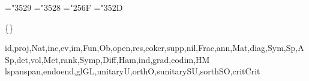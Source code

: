 

\def\@cntrprefix{\the\counter{part}.\the\counter{section}.\the\counter{subsection}.}

\def\pagedecor{\pageborder{rgb{.5 .9 .8}}{rgb{0 .3 .3}}{5}}
\def\setboxshadow{\def\boxshadowcolor{rgb{.3 .8 .7}}}
\def\contentbox{\bppbox{rgb{.7 1 .9}}{rgb{0 .3 .3}}{rgb{0 .4 .4}}}

\mathchardef\supsetneq="3529
\mathchardef\subsetneq="3528
\mathchardef\rtimes="256F
\mathchardef\nmid="352D

\def\lrcorner{\delimiter"5479479\relax}
\def\imult{\mathbin{\lrcorner}}

\def\d{\mathop{}\!d}

\def\interior#1{{\mathop{\kern\z@#1}\limits^{\circ}}}

\def\eval#1{\left.#1\right|}
\def\pdvof#1#2{\frac{\partial #1}{\partial #2}}
\def\evpdvof#1#2{\eval{\pdvof{#1}{#2}}}
\def\pdv#1{\pdvof{}{#1}}
\def\evpdv#1{\eval{\pdv{#1}}}
\def\ipdvof#1#2{\partial #1/\partial #2}
\def\ievpdvof#1#2{\eval{\ipdvof{#1}{#2}}}
\def\ipdv#1{\ipdvof{}{#1}}
\def\ievpdv#1{\eval{\ipdv{#1}}}
\def\drvof#1#2{\frac{d#1}{d#2}}
\def\drv#1{\drvof{}{#1}}
\def\evdrv#1{\eval{\drv{#1}}}

\{{}\}


\commap{}
\commap{}
\commap{}
\commap{}

\def\mathnotefont{\sf}
\commap{}

\def\mathnamefont{\sf}
\commap{}

\makemathops\rm{id,proj,Nat,inc,ev,im,Fun,Ob,open,res,coker,supp,nil,Frac,ann,Mat,diag,Sym,Sp,ASp,det,vol,Met,rank,Symp,Diff,Ham,ind,grad,codim,HM}
\makemathopsA\rm{{lspan}{span},{endo}{end},{gl}{GL},{unitary}{U},{orth}{O},{sunitary}{SU},{sorth}{SO},{crit}{Crit}}
\makemathopsA{}


